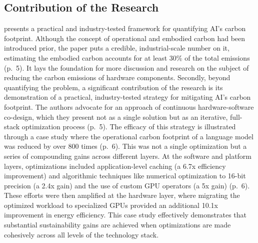 \documentclass[a4paper, 12pt]{article}
\begin{document}
\subsection{Contribution of the Research}
\citet{Wu2022} presents a practical and industry-tested framework for quantifying AI's carbon footprint. Although the concept of operational and embodied carbon had been introduced prior, the paper puts a credible, industrial-scale number on it, estimating the embodied carbon accounts for at least 30\% of the total emissions (p.~5). It lays the foundation for more discussion and research on the subject of reducing the carbon emissions of hardware components. Secondly, beyond quantifying the problem, a significant contribution of the research is its demonstration of a practical, industry-tested strategy for mitigating AI's carbon footprint. The authors advocate for an approach of continuous hardware-software co-design, which they present not as a single solution but as an iterative, full-stack optimization process (p.~5). The efficacy of this strategy is illustrated through a case study where the operational carbon footprint of a language model was reduced by over 800 times (p.~6). This was not a single optimization but a series of compounding gains across different layers. At the software and platform layers, optimizations included application-level caching (a 6.7x efficiency improvement) and algorithmic techniques like numerical optimization to 16-bit precision (a 2.4x gain) and the use of custom GPU operators (a 5x gain) (p.~6). These efforts were then amplified at the hardware layer, where migrating the optimized workload to specialized GPUs provided an additional 10.1x improvement in energy efficiency. This case study effectively demonstrates that substantial sustainability gains are achieved when optimizations are made cohesively across all levels of the technology stack.\hfill \break
\end{document}
